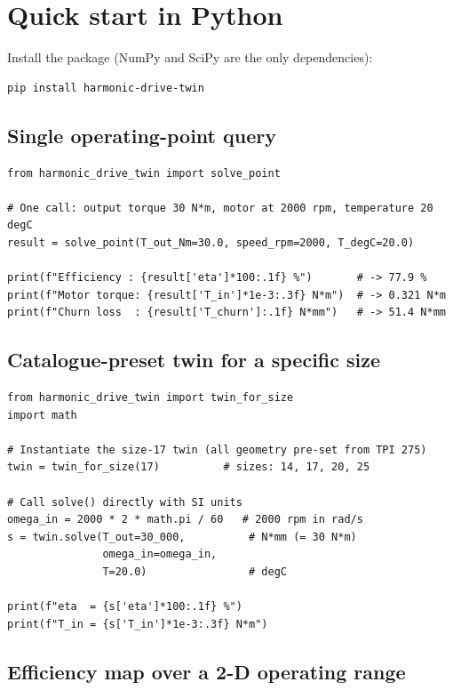 \documentclass[11pt,a4paper]{article}
\begin{document}
\section{Quick start in Python}

Install the package (NumPy and SciPy are the only dependencies):

\begin{lstlisting}
pip install harmonic-drive-twin
\end{lstlisting}

\subsection{Single operating-point query}

\begin{lstlisting}
from harmonic_drive_twin import solve_point

# One call: output torque 30 N*m, motor at 2000 rpm, temperature 20 degC
result = solve_point(T_out_Nm=30.0, speed_rpm=2000, T_degC=20.0)

print(f"Efficiency : {result['eta']*100:.1f} %")       # -> 77.9 %
print(f"Motor torque: {result['T_in']*1e-3:.3f} N*m")  # -> 0.321 N*m
print(f"Churn loss  : {result['T_churn']:.1f} N*mm")   # -> 51.4 N*mm
\end{lstlisting}

\subsection{Catalogue-preset twin for a specific size}

\begin{lstlisting}
from harmonic_drive_twin import twin_for_size
import math

# Instantiate the size-17 twin (all geometry pre-set from TPI 275)
twin = twin_for_size(17)          # sizes: 14, 17, 20, 25

# Call solve() directly with SI units
omega_in = 2000 * 2 * math.pi / 60   # 2000 rpm in rad/s
s = twin.solve(T_out=30_000,          # N*mm (= 30 N*m)
               omega_in=omega_in,
               T=20.0)                # degC

print(f"eta  = {s['eta']*100:.1f} %")
print(f"T_in = {s['T_in']*1e-3:.3f} N*m")
\end{lstlisting}

\subsection{Efficiency map over a 2-D operating range}
\end{document}
